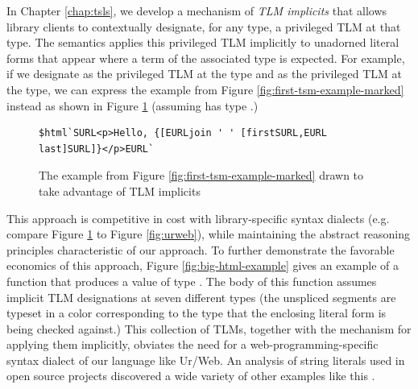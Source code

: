 In Chapter \ref{chap:tsls}, we develop a mechanism of \emph{TLM implicits} that allows library clients to contextually designate, for any type, a privileged TLM at that type. The semantics applies this privileged TLM implicitly to unadorned literal forms that appear where a term of the associated type is expected. For example, if we designate  as the privileged TLM at the  type and  as the privileged TLM at the  type, we can express the example from Figure \ref{fig:first-tsm-example-marked} instead as shown in Figure \ref{fig:first-tsm-example-implicit} (assuming  has type .) 
\begin{figure}[h]
\begin{lstlisting}[numbers=none]
$html`SURL<p>Hello, {[EURLjoin ' ' [firstSURL,EURL last]SURL]}</p>EURL`
\end{lstlisting}
\caption{The example from Figure \ref{fig:first-tsm-example-marked} drawn to take advantage of TLM implicits}
\label{fig:first-tsm-example-implicit}
\end{figure}

\noindent This approach is competitive in cost with library-specific syntax dialects (e.g. compare Figure \ref{fig:first-tsm-example-implicit} to Figure \ref{fig:urweb}), while maintaining the abstract reasoning principles characteristic of our approach. To further demonstrate the favorable economics of this approach, Figure \ref{fig:big-html-example} gives an example of a function that produces a value of type . The body of this function assumes implicit TLM designations at seven different types (the unspliced segments are typeset in a color corresponding to the type that the enclosing literal form is being checked against.) This collection of TLMs, together with the mechanism for applying them implicitly, obviates the need for a web-programming-specific syntax dialect of our language like Ur/Web. An analysis of string literals used in open source projects discovered a wide variety of other examples like this \cite{TSLs}.


